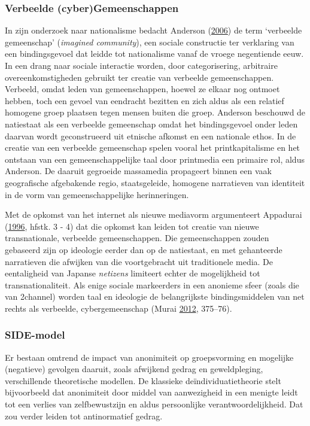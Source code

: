 \documentclass[10.5pt,dutch,]{article}
\begin{document}
\subsubsection{Verbeelde
(cyber)Gemeenschappen}\label{verbeelde-cybergemeenschappen}

In zijn onderzoek naar nationalisme bedacht Anderson
(\protect\hyperlink{ref-andersonux5fimaginedux5f2006}{2006}) de term
`verbeelde gemeenschap' (\emph{imagined community}), een sociale
constructie ter verklaring van een bindingsgevoel dat leidde tot
nationalisme vanaf de vroege negentiende eeuw. In een drang naar sociale
interactie worden, door categorisering, arbitraire overeenkomstigheden
gebruikt ter creatie van verbeelde gemeenschappen. Verbeeld, omdat leden
van gemeenschappen, hoewel ze elkaar nog ontmoet hebben, toch een gevoel
van eendracht bezitten en zich aldus als een relatief homogene groep
plaatsen tegen mensen buiten die groep. Anderson beschouwd de natiestaat
als een verbeelde gemeenschap omdat het bindingsgevoel onder leden
daarvan wordt geconstrueerd uit etnische afkomst en een nationale ethos.
In de creatie van een verbeelde gemeenschap spelen vooral het
printkapitalisme en het ontstaan van een gemeenschappelijke taal door
printmedia een primaire rol, aldus Anderson. De daaruit gegroeide
massamedia propageert binnen een vaak geografische afgebakende regio,
staatsgeleide, homogene narratieven van identiteit in de vorm van
gemeenschappelijke herinneringen.

Met de opkomst van het internet als nieuwe mediavorm argumenteert
Appadurai (\protect\hyperlink{ref-appaduraiux5fmodernityux5f1996}{1996},
hfstk. 3 - 4) dat die opkomst kan leiden tot creatie van nieuwe
transnationale, verbeelde gemeenschappen. Die gemeenschappen zouden
gebaseerd zijn op ideologie eerder dan op de natiestaat, en met
gehanteerde narratieven die afwijken van die voortgebracht uit
traditionele media. De eentaligheid van Japanse \emph{netizens}
limiteert echter de mogelijkheid tot transnationaliteit. Als enige
sociale markeerders in een anonieme sfeer (zoals die van 2channel)
worden taal en ideologie de belangrijkste bindingsmiddelen van net
rechts als verbeelde, cybergemeenschap (Murai
\protect\hyperlink{ref-muraiux5fnetux5f2012}{2012}, 375--76).

\subsubsection{SIDE-model}\label{side-model}

Er bestaan omtrend de impact van anonimiteit op groepsvorming en
mogelijke (negatieve) gevolgen daaruit, zoals afwijkend gedrag en
geweldpleging, verschillende theoretische modellen. De klassieke
deïndividuatietheorie stelt bijvoorbeeld dat anonimiteit door middel van
aanwezigheid in een menigte leidt tot een verlies van zelfbewustzijn en
aldus persoonlijke verantwoordelijkheid. Dat zou verder leiden tot
antinormatief gedrag.
\end{document}
